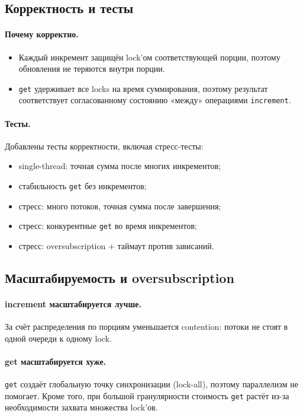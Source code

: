 \documentclass[a4paper,12pt]{article}
\begin{document}
\subsection{Корректность и тесты}

\paragraph{Почему корректно.}
\begin{itemize}
  \item Каждый инкремент защищён lock'ом соответствующей порции, поэтому обновления не теряются внутри порции.
  \item \texttt{get} удерживает все locks на время суммирования, поэтому результат соответствует согласованному состоянию
  «между» операциями \texttt{increment}.
\end{itemize}

\paragraph{Тесты.}
Добавлены тесты корректности, включая стресс-тесты:
\begin{itemize}
  \item single-thread: точная сумма после многих инкрементов;
  \item стабильность \texttt{get} без инкрементов;
  \item стресс: много потоков, точная сумма после завершения;
  \item стресс: конкурентные \texttt{get} во время инкрементов;
  \item стресс: oversubscription + таймаут против зависаний.
\end{itemize}

\subsection{Масштабируемость и oversubscription}

\paragraph{increment масштабируется лучше.}
За счёт распределения по порциям уменьшается contention: потоки не стоят в одной очереди к одному lock.

\paragraph{get масштабируется хуже.}
\texttt{get} создаёт глобальную точку синхронизации (lock-all), поэтому параллелизм не помогает.
Кроме того, при большой гранулярности стоимость \texttt{get} растёт из-за необходимости захвата множества lock'ов.
\end{document}
